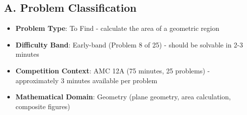 \documentclass[11pt]{article}
\begin{document}
\begin{problemconfigbox}
\subsection*{A. Problem Classification}
\begin{itemize}[leftmargin=*]
    \item \textbf{Problem Type}: To Find - calculate the area of a geometric region
    \item \textbf{Difficulty Band}: Early-band (Problem 8 of 25) - should be solvable in 2-3 minutes
    \item \textbf{Competition Context}: AMC 12A (75 minutes, 25 problems) - approximately 3 minutes available per problem
    \item \textbf{Mathematical Domain}: Geometry (plane geometry, area calculation, composite figures)
\end{itemize}


\end{problemconfigbox}
\end{document}
